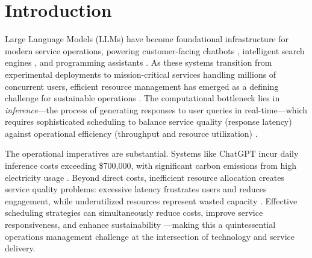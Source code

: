 \section{Introduction}

Large Language Models (LLMs) have become foundational infrastructure for modern service operations, powering customer-facing chatbots \citep{anthropic2023claude, bai2023qwen, openai2024gpt4technicalreport, deepseekai2025deepseekr1incentivizingreasoningcapability}, intelligent search engines \citep{google2023bard, microsoft2023bing}, and programming assistants \citep{copilot, claude_3_7}. As these systems transition from experimental deployments to mission-critical services handling millions of concurrent users, efficient resource management has emerged as a defining challenge for sustainable operations \citep{devlin2019bert, brown2020language, kaplan2020scaling, ouyang2022training, wei2022emergent, wei2022chain, touvron2023llama}. The computational bottleneck lies in \textit{inference}---the process of generating responses to user queries in real-time---which requires sophisticated scheduling to balance service quality (response latency) against operational efficiency (throughput and resource utilization) \citep{garcia2019estimation}.

The operational imperatives are substantial. Systems like ChatGPT incur daily inference costs exceeding \$700,000, with significant carbon emissions from high electricity usage \citep{patel2023peeling, patterson2021carbon}. Beyond direct costs, inefficient resource allocation creates service quality problems: excessive latency frustrates users and reduces engagement, while underutilized resources represent wasted capacity \citep{strubell2019energy, desislavov2021compute}. Effective scheduling strategies can simultaneously reduce costs, improve service responsiveness, and enhance sustainability \citep{wu2022sustainable}---making this a quintessential operations management challenge at the intersection of technology and service delivery.

